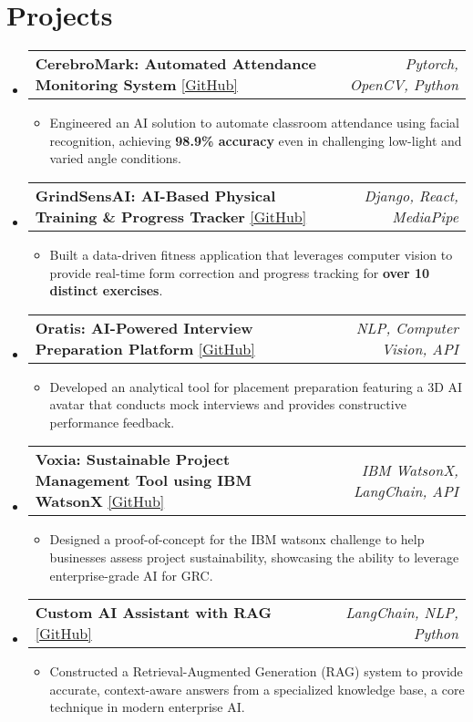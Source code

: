 \documentclass[letterpaper,10pt]{article}
\makeatletter
\newcommand{\resumeItem}[1]{\item\small{#1\vspace{-2pt}}}
\newcommand{\resumeProjectHeading}[3]{
    \item
    \begin{tabular*}{0.97\textwidth}{l@{\extracolsep{\fill}}r}
      \textbf{#1} \href{#2}{\small[GitHub]} & \textit{\small#3} \\
    \end{tabular*}\vspace{-2pt}
}
\newcommand{\resumeSubHeadingListStart}{\begin{itemize}[leftmargin=0.15in, label={}]}
\newcommand{\resumeSubHeadingListEnd}{\end{itemize}}
\newcommand{\resumeItemListStart}{\begin{itemize}[leftmargin=0.15in, itemsep=-3pt, topsep=0pt]}
\newcommand{\resumeItemListEnd}{\end{itemize}\vspace{-5pt}}
\makeatother
\begin{document}
\section{Projects}
\resumeSubHeadingListStart
    \resumeProjectHeading
        {CerebroMark: Automated Attendance Monitoring System}
        {https://github.com/Ronin-117/Automated_attendance}
        {Pytorch, OpenCV, Python}
    \resumeItemListStart
        \resumeItem{Engineered an AI solution to automate classroom attendance using facial recognition, achieving \textbf{98.9\% accuracy} even in challenging low-light and varied angle conditions.}
    \resumeItemListEnd

    \resumeProjectHeading
        {GrindSensAI: AI-Based Physical Training \& Progress Tracker}
        {https://github.com/Ronin-117/GrindSensAI}
        {Django, React, MediaPipe}
    \resumeItemListStart
        \resumeItem{Built a data-driven fitness application that leverages computer vision to provide real-time form correction and progress tracking for \textbf{over 10 distinct exercises}.}
    \resumeItemListEnd
    
    \resumeProjectHeading
        {Oratis: AI-Powered Interview Preparation Platform}
        {https://github.com/Ronin-117/Mock_Online_InterviewAi}
        {NLP, Computer Vision, API}
    \resumeItemListStart
        \resumeItem{Developed an analytical tool for placement preparation featuring a 3D AI avatar that conducts mock interviews and provides constructive performance feedback.}
    \resumeItemListEnd
    
    \resumeProjectHeading
        {Voxia: Sustainable Project Management Tool using IBM WatsonX}
        {https://github.com/Ronin-117/sustainability-tool}
        {IBM WatsonX, LangChain, API}
    \resumeItemListStart
        \resumeItem{Designed a proof-of-concept for the IBM watsonx challenge to help businesses assess project sustainability, showcasing the ability to leverage enterprise-grade AI for GRC.}
    \resumeItemListEnd
    
    \resumeProjectHeading
        {Custom AI Assistant with RAG}
        {https://github.com/Ronin-117/lang_chain_test}
        {LangChain, NLP, Python}
    \resumeItemListStart
        \resumeItem{Constructed a Retrieval-Augmented Generation (RAG) system to provide accurate, context-aware answers from a specialized knowledge base, a core technique in modern enterprise AI.}
    \resumeItemListEnd
\resumeSubHeadingListEnd

\end{document}
